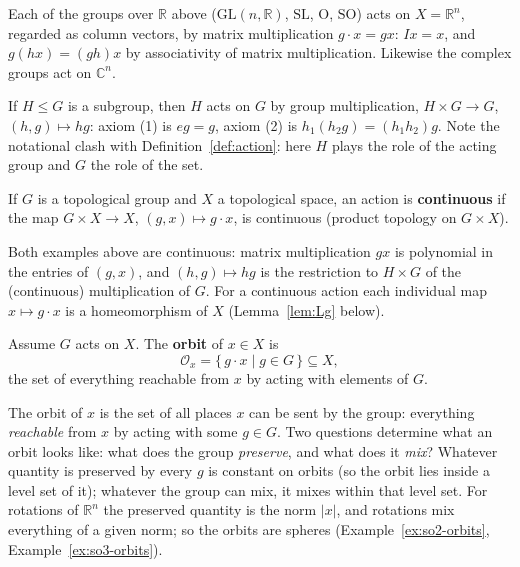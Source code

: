 \documentclass[11pt]{report}
\makeatletter
\newcounter{defcounter}[section]
\newcounter{excounter}[section]
\newcommand{\deflabel}[1]{\edef\@currentlabel{\arabic{section}.\arabic{defcounter}}\label{#1}}
\newcommand{\exlabel}[1]{\edef\@currentlabel{\arabic{section}.\arabic{excounter}}\label{#1}}
\newcommand{\GL}{\mathrm{GL}}
\newcommand{\SL}{\mathrm{SL}}
\newcommand{\Ogp}{\mathrm{O}}
\newcommand{\SO}{\mathrm{SO}}
\newcommand{\leeref}[1]{\par\smallskip{\raggedleft\footnotesize\textsc{Lee}:\ #1\par}}
\makeatother
\begin{document}
\begin{exbox}\exlabel{ex:matrix-groups-acting-column-vectors}
Each of the groups over $\mathbb{R}$ above ($\GL(n,\mathbb{R})$, $\SL$, $\Ogp$, $\SO$) acts on $X = \mathbb{R}^n$, regarded as column vectors, by matrix multiplication $g \cdot x = gx$: $Ix = x$, and $g(hx) = (gh)x$ by associativity of matrix multiplication. Likewise the complex groups act on $\mathbb{C}^n$.
\end{exbox}

\begin{exbox}\exlabel{ex:subgroup-acting-multiplication}
If $H \le G$ is a subgroup, then $H$ acts on $G$ by group multiplication, $H \times G \to G$, $(h, g) \mapsto hg$: axiom (1) is $eg = g$, axiom (2) is $h_1(h_2 g) = (h_1 h_2) g$. Note the notational clash with Definition~\ref{def:action}: here $H$ plays the role of the acting group and $G$ the role of the set.
\end{exbox}

\begin{defbox}\deflabel{def:continuous-action}
If $G$ is a topological group and $X$ a topological space, an action is \textbf{continuous} if the map $G \times X \to X$, $(g,x) \mapsto g \cdot x$, is continuous (product topology on $G \times X$).
\end{defbox}

\begin{rembox}\label{rem:actions}
Both examples above are continuous: matrix multiplication $g x$ is polynomial in the entries of $(g, x)$, and $(h, g) \mapsto hg$ is the restriction to $H \times G$ of the (continuous) multiplication of $G$. For a continuous action each individual map $x \mapsto g \cdot x$ is a homeomorphism of $X$ (Lemma~\ref{lem:Lg} below).
\end{rembox}

\begin{defbox}[Orbit]\deflabel{def:orbit}
Assume $G$ acts on $X$. The \textbf{orbit} of $x \in X$ is
\[
\mathcal{O}_x = \{\, g \cdot x \mid g \in G \,\} \subseteq X,
\]
the set of everything reachable from $x$ by acting with elements of $G$.
\leeref{Ch.~7, \emph{Group Actions and Equivariant Maps}}
\end{defbox}

\begin{rembox}\label{rem:what-orbit}
The orbit of $x$ is the set of all places $x$ can be sent by the group: everything \emph{reachable} from $x$ by acting with some $g \in G$. Two questions determine what an orbit looks like: what does the group \emph{preserve}, and what does it \emph{mix}? Whatever quantity is preserved by every $g$ is constant on orbits (so the orbit lies inside a level set of it); whatever the group can mix, it mixes within that level set. For rotations of $\mathbb{R}^n$ the preserved quantity is the norm $|x|$, and rotations mix everything of a given norm; so the orbits are spheres (Example~\ref{ex:so2-orbits}, Example~\ref{ex:so3-orbits}).
\end{rembox}
\end{document}

